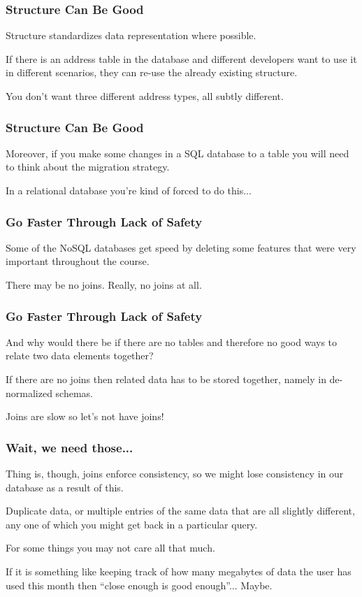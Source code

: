 \begin{frame}
\frametitle{Structure Can Be Good}

Structure standardizes data representation where possible. 

If there is an address table in the database and different developers want to use it in different scenarios, they can re-use the already existing structure.

You don't want three different address types, all subtly different.

\end{frame}



\begin{frame}
\frametitle{Structure Can Be Good}


Moreover, if you make some changes in a SQL database to a table you will need to think about the migration strategy.

In a relational database you're kind of forced to do this...

\end{frame}



\begin{frame}
\frametitle{Go Faster Through Lack of Safety}

Some of the NoSQL databases get speed by deleting some features that were very important throughout the course. 

There may be no joins. Really, no joins at all. 

\end{frame}



\begin{frame}
\frametitle{Go Faster Through Lack of Safety}

And why would there be if there are no tables and therefore no good ways to relate two data elements together? 

If there are no joins then related data has to be stored together, namely in de-normalized schemas.

Joins are slow so let's not have joins!

\end{frame}


\begin{frame}
\frametitle{Wait, we need those...}

Thing is, though, joins enforce consistency, so we might lose consistency in our database as a result of this. 

Duplicate data, or multiple entries of the same data that are all slightly different, any one of which you might get back in a particular query. 

For some things you may not care all that much. 

If it is something like keeping track of how many megabytes of data the user has used this month then ``close enough is good enough''... Maybe.


\end{frame}



